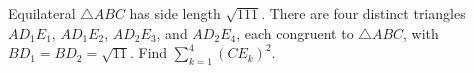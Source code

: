 Equilateral $\triangle ABC$ has side length $\sqrt{111}$. There are four distinct triangles $AD_1E_1$, $AD_1E_2$, $AD_2E_3$, and $AD_2E_4$, each congruent to $\triangle ABC$, with $BD_1 = BD_2=\sqrt{11}$. Find $\sum^4_{k=1}(CE_k)^2$.